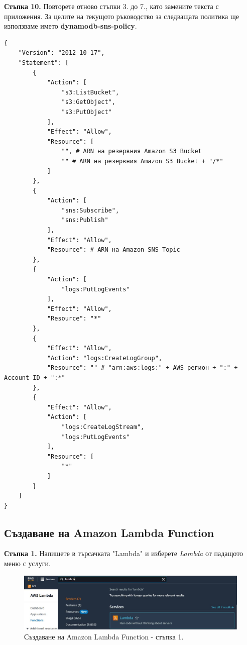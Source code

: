 \documentclass[12pt]{article}
\begin{document}
\noindent\textbf{Стъпка 10.} Повторете отново стъпки 3. до 7., като замените текста с приложения. За целите на текущото ръководство за следващата политика ще използваме името \textbf{dynamodb-sns-policy}.

\begin{verbatim}
{
    "Version": "2012-10-17",
    "Statement": [
        {
            "Action": [
                "s3:ListBucket",
                "s3:GetObject",
                "s3:PutObject"
            ],
            "Effect": "Allow",
            "Resource": [
                "", # ARN на резервния Amazon S3 Bucket
                "" # ARN на резервния Amazon S3 Bucket + "/*"
            ]
        },
        {
            "Action": [
                "sns:Subscribe",
                "sns:Publish"
            ],
            "Effect": "Allow",
            "Resource": # ARN на Amazon SNS Topic
        },
        {
            "Action": [
                "logs:PutLogEvents"
            ],
            "Effect": "Allow",
            "Resource": "*"
        },
        {
            "Effect": "Allow",
            "Action": "logs:CreateLogGroup",
            "Resource": "" # "arn:aws:logs:" + AWS регион + ":" + Account ID + ":*"
        },
        {
            "Effect": "Allow",
            "Action": [
                "logs:CreateLogStream",
                "logs:PutLogEvents"
            ],
            "Resource": [
                "*"
            ]
        }
    ]
}
\end{verbatim}


\clearpage
\pagebreak


\subsection{Създаване на Amazon Lambda Function}
\noindent\textbf{Стъпка 1.} Напишете в търсачката "Lambda" и изберете \textit{Lambda} от падащото меню с услуги.
\begin{figure}[h!]
\centering
    \includegraphics[scale=0.4]{instructions/lambda/1.JPG}
  \caption{Създаване на Amazon Lambda Function - стъпка 1.}
\end{figure}
\end{document}
